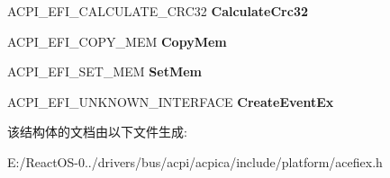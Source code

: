 \begin{DoxyCompactItemize}
A\+C\+P\+I\+\_\+\+E\+F\+I\+\_\+\+C\+A\+L\+C\+U\+L\+A\+T\+E\+\_\+\+C\+R\+C32 {\bfseries Calculate\+Crc32}
\item 
\mbox{\label{struct___a_c_p_i___e_f_i___b_o_o_t___s_e_r_v_i_c_e_s_a8269fca036ceaade28db7af4cd5113fa}} 
A\+C\+P\+I\+\_\+\+E\+F\+I\+\_\+\+C\+O\+P\+Y\+\_\+\+M\+EM {\bfseries Copy\+Mem}
\item 
\mbox{\label{struct___a_c_p_i___e_f_i___b_o_o_t___s_e_r_v_i_c_e_s_a317e7204565554af8904f887d4c7f376}} 
A\+C\+P\+I\+\_\+\+E\+F\+I\+\_\+\+S\+E\+T\+\_\+\+M\+EM {\bfseries Set\+Mem}
\item 
\mbox{\label{struct___a_c_p_i___e_f_i___b_o_o_t___s_e_r_v_i_c_e_s_a908a4a72c19553c2fe10f1daabfb1403}} 
A\+C\+P\+I\+\_\+\+E\+F\+I\+\_\+\+U\+N\+K\+N\+O\+W\+N\+\_\+\+I\+N\+T\+E\+R\+F\+A\+CE {\bfseries Create\+Event\+Ex}
\end{DoxyCompactItemize}


该结构体的文档由以下文件生成\+:\begin{DoxyCompactItemize}
\item 
E\+:/\+React\+O\+S-\/0../drivers/bus/acpi/acpica/include/platform/acefiex.\+h\end{DoxyCompactItemize}
